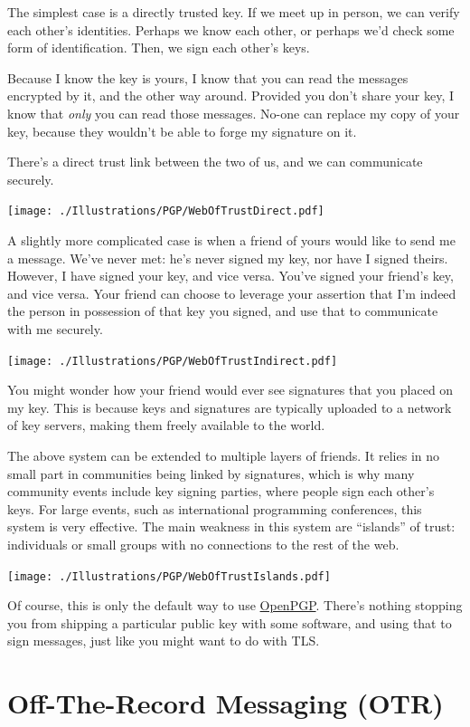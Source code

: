 \documentclass[11pt,ebook,table,dvipsnames]{memoir}
\begin{document}
The simplest case is a directly trusted key. If we meet up in person,
we can verify each other's identities. Perhaps we know each other, or
perhaps we'd check some form of identification. Then, we sign each other's
keys.

Because I know the key is yours, I know that you can read the messages
encrypted by it, and the other way around. Provided you don't share
your key, I know that \emph{only} you can read those messages. No-one can
replace my copy of your key, because they wouldn't be able to forge my
signature on it.

There's a direct trust link between the two of us, and we can
communicate securely.

\texttt{[image: ./Illustrations/PGP/WebOfTrustDirect.pdf]}

A slightly more complicated case is when a friend of yours would like
to send me a message. We've never met: he's never signed my key, nor
have I signed theirs. However, I have signed your key, and vice
versa. You've signed your friend's key, and vice versa. Your friend
can choose to leverage your assertion that I'm indeed the person in
possession of that key you signed, and use that to communicate with
me securely.

\texttt{[image: ./Illustrations/PGP/WebOfTrustIndirect.pdf]}

You might wonder how your friend would ever see signatures that you
placed on my key. This is because keys and signatures are typically
uploaded to a network of key servers, making them freely available to
the world.

The above system can be extended to multiple layers of friends. It
relies in no small part in communities being linked by signatures,
which is why many community events include key signing parties, where
people sign each other's keys. For large events, such as international
programming conferences, this system is very effective. The main
weakness in this system are \enquote{islands} of trust: individuals or small
groups with no connections to the rest of the web.

\texttt{[image: ./Illustrations/PGP/WebOfTrustIslands.pdf]}

Of course, this is only the default way to use \hyperref[OpenPGP]{OpenPGP}. There's
nothing stopping you from shipping a particular public key with some
software, and using that to sign messages, just like you might want to
do with TLS.
\chapter{Off-The-Record Messaging (\label{OTR}OTR)}
\label{sec-3-3}
\end{document}
